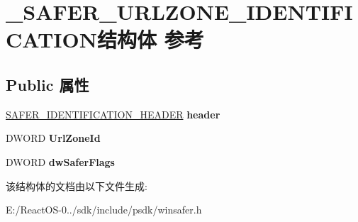 \hypertarget{struct___s_a_f_e_r___u_r_l_z_o_n_e___i_d_e_n_t_i_f_i_c_a_t_i_o_n}{}\section{\+\_\+\+S\+A\+F\+E\+R\+\_\+\+U\+R\+L\+Z\+O\+N\+E\+\_\+\+I\+D\+E\+N\+T\+I\+F\+I\+C\+A\+T\+I\+O\+N结构体 参考}
\label{struct___s_a_f_e_r___u_r_l_z_o_n_e___i_d_e_n_t_i_f_i_c_a_t_i_o_n}
\subsection*{Public 属性}
\begin{DoxyCompactItemize}
\item 
\mbox{\label{struct___s_a_f_e_r___u_r_l_z_o_n_e___i_d_e_n_t_i_f_i_c_a_t_i_o_n_a8b288f0e7a641a64e078f55cb2bc6447}} 
\hyperlink{struct___s_a_f_e_r___i_d_e_n_t_i_f_i_c_a_t_i_o_n___h_e_a_d_e_r}{S\+A\+F\+E\+R\+\_\+\+I\+D\+E\+N\+T\+I\+F\+I\+C\+A\+T\+I\+O\+N\+\_\+\+H\+E\+A\+D\+ER} {\bfseries header}
\item 
\mbox{\label{struct___s_a_f_e_r___u_r_l_z_o_n_e___i_d_e_n_t_i_f_i_c_a_t_i_o_n_ae765ac913568354dd6946251c3ea58c8}} 
D\+W\+O\+RD {\bfseries Url\+Zone\+Id}
\item 
\mbox{\label{struct___s_a_f_e_r___u_r_l_z_o_n_e___i_d_e_n_t_i_f_i_c_a_t_i_o_n_a13611c9651999d6c2e1c6b880fd15a89}} 
D\+W\+O\+RD {\bfseries dw\+Safer\+Flags}
\end{DoxyCompactItemize}


该结构体的文档由以下文件生成\+:\begin{DoxyCompactItemize}
\item 
E\+:/\+React\+O\+S-\/0../sdk/include/psdk/winsafer.\+h\end{DoxyCompactItemize}
